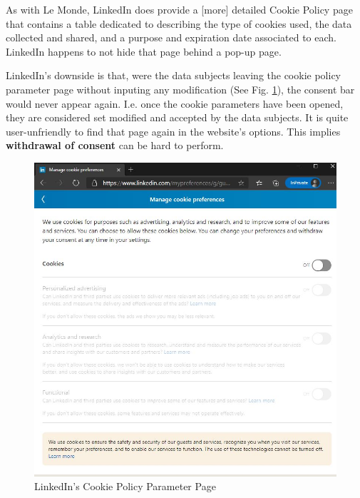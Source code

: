 \documentclass[twocolumn, letterpaper]{scrartcl}
\begin{document}
	    As with Le Monde, LinkedIn does provide a [more] detailed Cookie Policy page that contains a table dedicated to describing the type of cookies used, the data collected and shared, and a purpose and expiration date associated to each. LinkedIn happens to not hide that page behind a pop-up page.
	    
	    LinkedIn's downside is that, were the data subjects leaving the cookie policy parameter page without inputing any modification (See Fig. \ref{fig:h}), the consent bar would never appear again. I.e. once the cookie parameters have been opened, they are considered set modified and accepted by the data subjects. It is quite user-unfriendly to find that page again in the website's options. This implies \textbf{withdrawal of consent} can be hard to perform.

        \begin{figure}[tbp]	
        \includegraphics[width=0.9\linewidth]{ld_cn.JPG}
        \caption{LinkedIn's Cookie Policy Parameter Page \label{fig:h}}
        \end{figure}
        
\end{document}
